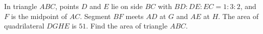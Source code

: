 In triangle $ABC$, points $D$ and $E$ lie on side $BC$ with $BD:DE:EC=1:3:2$, and $F$ is the midpoint of $AC$. Segment $BF$ meets $AD$ at $G$ and $AE$ at $H$. The area of quadrilateral $DGHE$ is $51$. Find the area of triangle $ABC$.

